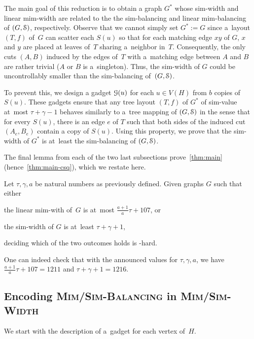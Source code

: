 \documentclass[a4paper,UKenglish,cleveref,hyperref,autoref]{lipics-v2021}
\begin{document}
The main goal of this reduction is to obtain a graph $G^*$ whose sim-width and linear mim-width are related to the the sim-balancing and linear mim-balancing of $(G,\cal S)$, respectively.
Observe that we cannot simply set $G^*:=G$ since a~layout $(T,f)$ of~$G$ can scatter each $S(u)$ so that for each matching edge $xy$ of $G$, $x$ and $y$ are placed at leaves of~$T$ sharing a~neighbor in~$T$.
Consequently, the only cuts $(A,B)$ induced by the edges of~$T$ with a~matching edge between $A$ and $B$ are rather trivial ($A$ or $B$ is a~singleton).
Thus, the sim-width of $G$ could be uncontrollably smaller than the sim-balancing of~$(G,\cal S)$. %

To prevent this, we design a gadget $\mathcal G(u)$ for each $u\in V(H)$ from $b$ copies of $S(u)$.
These gadgets ensure that any tree layout $(T,f)$ of $G^*$ of sim-value at~most $\tau+\gamma-1$ behaves similarly to a~tree mapping of $(G,\cal S)$ in the sense that for every $S(u)$, there is an edge $e$ of $T$ such that both sides of the induced cut $(A_e, B_e)$ contain a copy of $S(u)$. 
Using this property, we prove that the sim-width of $G^*$ is at~least the sim-balancing of $(G,\cal S)$.

The final lemma from each of the two last subsections prove~\cref{thm:main} (hence~\cref{thm:main-csq}), which we restate here.
\begin{theorem}
  Let $\tau, \gamma, a$ be natural numbers as previously defined.
  Given graphs $G$ such that either 
  \begin{compactitem}
  \item the linear mim-with of~$G$ is at~most $\frac{a+1}{a}\tau + 107$, or
  \item the sim-width of $G$ is at~least $\tau + \gamma + 1$,
  \end{compactitem}
  deciding which of the two outcomes holds is \NP-hard.
\end{theorem}
One can indeed check that with the announced values for $\tau, \gamma, a$, we have $\frac{a+1}{a}\tau + 107=1211$ and $\tau + \gamma + 1=1216$.

\subsection{Encoding \textsc{Mim/Sim-Balancing} in \textsc{Mim/Sim-Width}}

We start with the description of a~gadget for each vertex of~$H$.
\end{document}
